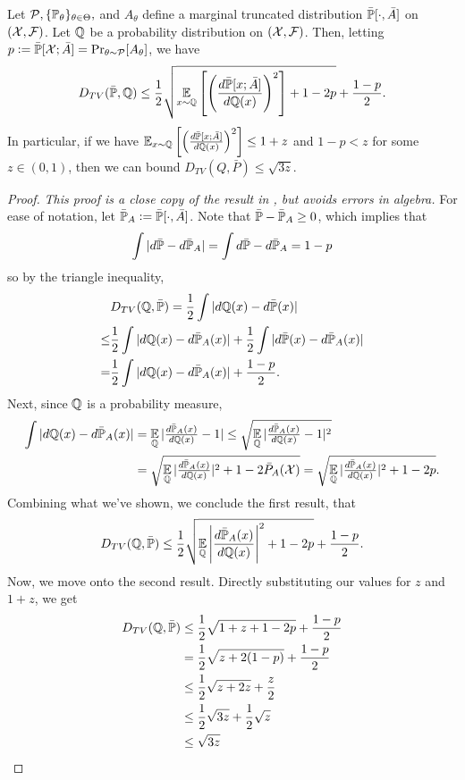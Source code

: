 \begin{importedlemma}
    \label{lem:corrected-truncated-dtv}
    Let \({\mathcal P},\{{\mathbb P}_\theta\}_{\theta\in\Theta},\) and \(A_\theta\) define a marginal truncated distribution \(\bar{{\mathbb P}}[\cdot,\bar A]\) on \(({\mathcal X},{\mathcal F})\).
    Let \({\mathbb Q}\) be a probability distribution on \(({\mathcal X},{\mathcal F})\).
    Then, letting \(p \;{\vcentcolon=}\; \bar {{\mathbb P}}[{\mathcal X}; \bar A] = \Pr_{\theta\sim{\mathcal P}}[A_\theta]\), we have
    \[
        D_{TV}(\bar {{\mathbb P}}, {\mathbb Q}) \leq \frac12 \sqrt{\operatorname*{\mathbb{E}}_{x \sim {\mathbb Q}}\left[\left(\frac{d\bar {{\mathbb P}}[x; \bar A]}{d{\mathbb Q}(x)}\right)^2\right]+1-2p} + \frac{1-p}{2}.
    \]
    In particular, if we have \(\operatorname*{\mathbb{E}}_{x\sim {\mathbb Q}}\left[\left(\frac{d\bar {{\mathbb P}}[x; \bar A]}{d{\mathbb Q}(x)}\right)^2\right] \leq 1+z\) and \(1-p < z\) for some \(z\in(0,1)\), then we can bound \(D_{TV}(Q, \bar P) \leq \sqrt{3z}\).
\end{importedlemma}
\begin{proof}
\emph{This proof is a close copy of the result in \cite{simchowitz2017gap}, but avoids errors in algebra.}
For ease of notation, let \(\bar {{\mathbb P}}_A := \bar {{\mathbb P}}[\cdot, \bar A]\).
Note that \(\bar {{\mathbb P}} - \bar {{\mathbb P}}_A \geq 0\), which implies that
\[
    \int \vert{d\bar {\ensuremath{{\mathbb P}}}- d \bar {\ensuremath{{\mathbb P}}}_A}\vert
    = \int d\bar {{\mathbb P}} - d \bar {{\mathbb P}}_A
    = 1 - p
\]
so by the triangle inequality,
\begin{align*}
    &D_{TV}(\bbQ, \bar \bbP)
    = \frac12  \int \abs{d \bbQ(x) - d \bar \bbP(x)} \\
    \leq & \frac12 \int \abs{d \bbQ(x) - d \bar \bbP_A(x)} + \frac12 \int \abs{d \bar \bbP(x) - d \bar \bbP_A(x)} \\
    = & \frac12 \int \abs{d \bbQ(x) - d \bar \bbP_A(x)} + \frac{1-p}{2}.
\end{align*}
Next, since \({\mathbb Q}\) is a probability measure,
\begin{align*}
    \int \abs{d \bbQ(x) - d \bar \bbP_A(x)}
    &= \E_{\bbQ}\abs{\tsfrac{d \bar \bbP_A(x)}{d\bbQ(x)} - 1}
    \leq \sqrt{\E_{\bbQ}\abs{\tsfrac{d \bar \bbP_A(x)}{d\bbQ(x)} - 1}^2} \\
    &= \sqrt{\E_{\bbQ}\abs{\tsfrac{d \bar \bbP_A(x)}{d\bbQ(x)}}^2 + 1 - 2 \bar P_A(\cX)}
    = \sqrt{\E_{\bbQ}\abs{\tsfrac{d \bar \bbP_A(x)}{d\bbQ(x)}}^2 + 1 - 2 p}.
\end{align*}
Combining what we've shown, we conclude the first result, that
\[
D_{TV}({\mathbb Q}, \bar {{\mathbb P}}) \leq \frac12 \sqrt{\operatorname*{\mathbb{E}}_{{\mathbb Q}} \left|\frac{d \bar {{\mathbb P}}_A(x)}{d{\mathbb Q}(x)}\right|^2 + 1 - 2 p} + \frac{1-p}{2}.
\]
Now, we move onto the second result.
Directly substituting our values for \(z\) and \(1+z\), we get
\begin{align*}
    D_{TV}({\mathbb Q}, \bar {{\mathbb P}})
    &\leq \frac12 \sqrt{1+z + 1 - 2 p} + \frac{1-p}{2} \\
    &= \frac12 \sqrt{z + 2(1-p)} + \frac{1-p}{2} \\
    &\leq \frac12 \sqrt{z + 2z} + \frac{z}{2} \\
    &\leq \frac{1}2 \sqrt{3z} + \frac{1}{2}\sqrt{z} \\
    &\leq \sqrt{3z}
\end{align*}
\end{proof}

